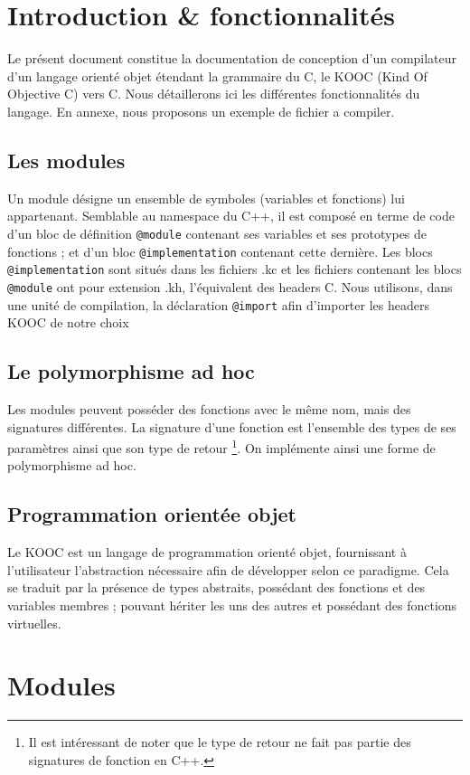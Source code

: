 \documentclass[12pt,a4paper]{article}
\def\code#1{\texttt{#1}}
\begin{document}
\begin{NoHyper}
  \tableofcontents
  \newpage
  \section{Introduction \& fonctionnalités}
  Le présent document constitue la documentation de conception d'un compilateur d'un langage orienté objet étendant la grammaire du C, le KOOC (Kind Of Objective C) vers C. Nous détaillerons ici les différentes fonctionnalités du langage. En annexe, nous proposons un exemple de fichier a compiler.
  \subsection{Les modules}
  Un module désigne un ensemble de symboles (variables et fonctions) lui appartenant. Semblable au namespace du C++, il est composé en terme de code d'un bloc de définition \code{@module} contenant ses variables et ses prototypes de fonctions ; et d'un bloc \code{@implementation} contenant cette dernière. Les blocs \code{@implementation} sont situés dans les fichiers .kc et les fichiers contenant les blocs \code{@module} ont pour extension .kh, l'équivalent des headers C. Nous utilisons, dans une unité de compilation, la déclaration \code{@import} afin d'importer les headers KOOC de notre choix
  \subsection{Le polymorphisme ad hoc}
  Les modules peuvent posséder des fonctions avec le même nom, mais des signatures différentes. La signature d'une fonction est l'ensemble des types de ses paramètres ainsi que son type de retour \footnote{Il est intéressant de noter que le type de retour ne fait pas partie des signatures de fonction en C++.}. On implémente ainsi une forme de polymorphisme ad hoc.
  \subsection{Programmation orientée objet}
  Le KOOC est un langage de programmation orienté objet, fournissant à l'utilisateur l'abstraction nécessaire afin de développer selon ce paradigme. Cela se traduit par la présence de types abstraits, possédant des fonctions et des variables membres ; pouvant hériter les uns des autres et possédant des fonctions virtuelles.

  \section{Modules}

\end{NoHyper}
\end{document}
